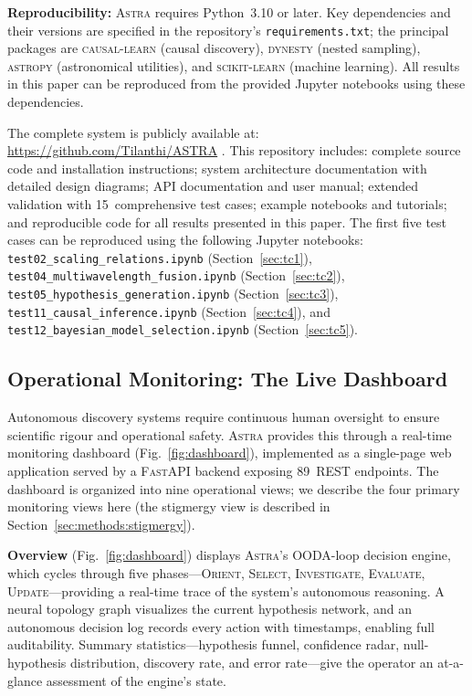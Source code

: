\documentclass[usenatbib]{rasti}
\newcommand{\astra}{\textsc{Astra}\xspace}
\begin{document}
\textbf{Reproducibility:}
\astra requires Python~3.10 or later.
Key dependencies and their versions are specified in the repository's \texttt{requirements.txt}; the principal packages are \textsc{causal-learn} (causal discovery), \textsc{dynesty} (nested sampling), \textsc{astropy} (astronomical utilities), and \textsc{scikit-learn} (machine learning).
All results in this paper can be reproduced from the provided Jupyter notebooks using these dependencies.

The complete system is publicly available at: \url{https://github.com/Tilanthi/ASTRA} \citep{White2026}.
This repository includes: complete source code and installation instructions; system architecture documentation with detailed design diagrams; API documentation and user manual; extended validation with 15~comprehensive test cases; example notebooks and tutorials; and reproducible code for all results presented in this paper.
The first five test cases can be reproduced using the following Jupyter notebooks:
\texttt{test02\_scaling\_relations.ipynb} (Section~\ref{sec:tc1}),
\texttt{test04\_multiwavelength\_fusion.ipynb} (Section~\ref{sec:tc2}),
\texttt{test05\_hypothesis\_generation.ipynb} (Section~\ref{sec:tc3}),
\texttt{test11\_causal\_inference.ipynb} (Section~\ref{sec:tc4}), and
\texttt{test12\_bayesian\_model\_selection.ipynb} (Section~\ref{sec:tc5}).

\subsection{Operational Monitoring: The Live Dashboard}
\label{sec:methods:dashboard}

Autonomous discovery systems require continuous human oversight to ensure scientific rigour and operational safety.
\astra provides this through a real-time monitoring dashboard (Fig.~\ref{fig:dashboard}), implemented as a single-page web application served by a \textsc{FastAPI} backend exposing 89~REST endpoints.
The dashboard is organized into nine operational views; we describe the four primary monitoring views here (the stigmergy view is described in Section~\ref{sec:methods:stigmergy}).

\textbf{Overview} (Fig.~\ref{fig:dashboard}) displays \astra's OODA-loop decision engine, which cycles through five phases---\textsc{Orient}, \textsc{Select}, \textsc{Investigate}, \textsc{Evaluate}, \textsc{Update}---providing a real-time trace of the system's autonomous reasoning.
A neural topology graph visualizes the current hypothesis network, and an autonomous decision log records every action with timestamps, enabling full auditability.
Summary statistics---hypothesis funnel, confidence radar, null-hypothesis distribution, discovery rate, and error rate---give the operator an at-a-glance assessment of the engine's state.
\end{document}
